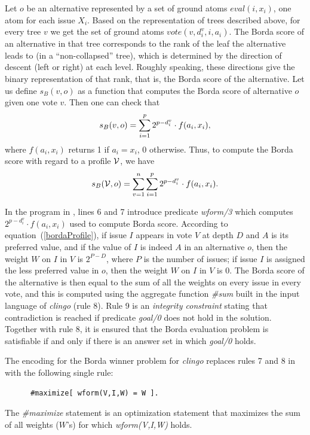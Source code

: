 Let $o$ be an alternative represented by a set of ground atoms 
$eval(i, x_i)$, one atom for each issue $X_i$. Based on the representation
of trees described above, for every tree $v$ we get the set of ground atoms 
$vote(v,d^v_i,i,a_i)$. The Borda score of an alternative in that tree
corresponds to the rank of the leaf the alternative leads to (in a ``non-collapsed'' tree), which is
determined by the direction of descent (left or right) at each level. 
Roughly speaking, these directions give the binary representation of that 
rank, that is, the Borda score of the alternative. Let us define 
$s_{B}(v, o)$ as a function that computes the Borda score 
of alternative $o$ given one vote $v$. Then one can check that
\begin{equation} \label{bordaOneVote}
  \small
  s_{B}(v, o) = \sum^p_{i=1} 2^{p-d^v_i} \cdot f(a_i, x_i),
  \end{equation}
where $f(a_i, x_i)$ returns 1 if $a_i= x_i$, 0 otherwise.
Thus, to compute the Borda score with regard to a profile $\mathcal{V}$, we have 
  \begin{equation} \label{bordaProfile}
    \small
    s_{B}(\mathcal{V},o) = \sum^n_{v=1} \sum^p_{i=1} 2^{p-d^v_i} \cdot f(a_i, x_i).
  \end{equation}

In the program in ,
lines 6 and 7 introduce predicate \textit{wform/3} which
computes $2^{p-d^v_i} \cdot f(a_i, x_i)$ used to
compute Borda score.
According to equation~(\ref{bordaProfile}),
if issue $I$ appears in vote $V$ at depth $D$
and $A$ is its preferred value, and if the value of $I$ is indeed $A$ in
an alternative $o$, then the weight $W$ on $I$ in $V$ is $2^{P-D}$, where $P$
is the number of issues; if issue $I$ is assigned the less preferred value
in $o$, then the weight $W$ on $I$ in $V$ is $0$. The Borda
score of the alternative is then equal to the sum of all the weights on
every issue in every vote, and this is computed using the aggregate
function \textit{\#sum} built in the input language of \emph{clingo} (rule 8).
Rule 9 is an \textit{integrity constraint} stating that contradiction 
is reached if predicate \textit{goal/0} does not hold in the solution.
Together with rule 8, it is ensured that the Borda evaluation problem is 
satisfiable if and only if there is an answer set in which \textit{goal/0} holds.


The encoding for the Borda winner problem for \emph{clingo} 
replaces rules 7 and 8 in  with the following 
single rule:
  \begin{framed}
  \small
    \begin{verbatim}
      #maximize[ wform(V,I,W) = W ].
    \end{verbatim}
  \end{framed}
The \textit{\#maximize} statement is an optimization statement that 
maximizes the sum of all weights ($W$'s) 
for which \textit{wform(V,I,W)} holds.

